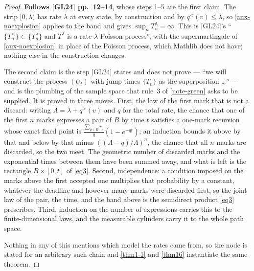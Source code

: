 \begin{proof}
  \leanok
  \textbf{Follows [GL24] pp.~12--14}, whose steps 1--5 are the first claim.  The strip
  $[0,\lambda)$ has rate $\lambda$ at every state, by construction and by $q^<(v) \le \lambda$,
  so \ref{aux-noexplosion} applies to the band and gives $\sup_n T^\lambda_n = \infty$.  This
  is [GL24]'s ``$\{T^<_n\} \subset \{T^\lambda_n\}$ and $T^\lambda$ is a rate-$\lambda$ Poisson
  process'', with the supermartingale of \ref{aux-noexplosion} in place of the Poisson process,
  which Mathlib does not have; nothing else in the construction changes.

  The second claim is the step [GL24] states and does not prove --- ``we will construct the
  process $(U_t)$ with jump times $\{T_n\}$ as the superposition \dots'' --- and is the
  plumbing of the sample space that rule~3 of \ref{note-green} asks to be supplied.  It is
  proved in three moves.  First, the law of the first mark that is not a discard: writing
  $\Lambda = \lambda + q^>(v)$ and $q$ for the total rate, the chance that one of the first $n$
  marks expresses a pair of $B$ by time $t$ satisfies a one-mark recursion whose exact fixed
  point is $\frac{\sum_{p \in B} r_p}{q}(1 - e^{-qt})$; an induction bounds it above by that
  and below by that minus $((\Lambda - q)/\Lambda)^n$, the chance that all $n$ marks are
  discarded, so the two meet.  The geometric number of discarded marks and the exponential
  times between them have been summed away, and what is left is the rectangle $B \times [0,t]$
  of \ref{eq3}.  Second, independence: a condition imposed on the marks above the first
  accepted one multiplies that probability by a constant, whatever the deadline and however
  many marks were discarded first, so the joint law of the pair, the time, and the band above
  is the semidirect product \ref{eq3} prescribes.  Third, induction on the number of
  expressions carries this to the finite-dimensional laws, and the measurable cylinders carry
  it to the whole path space.

  Nothing in any of this mentions which model the rates came from, so the node is stated for an
  arbitrary such chain and \ref{thm1-1} and \ref{thm16} instantiate the same theorem.
\end{proof}


